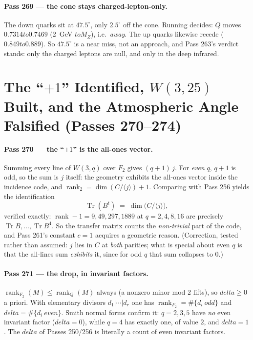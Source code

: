 \documentclass[12pt,a4paper]{article}
\def\mathbf#1{#1}%
\def\text#1{#1}%
\def\delta{delta}%
\def\to{ to }%
\theoremstyle{definition}
\begin{document}
\paragraph{Pass 269 --- the cone stays charged-lepton-only.} The down quarks sit
at $47.5^\circ$, only $2.5^\circ$ off the cone. Running decides: $Q$ moves
$0.7314\to0.7469$ ($2$~GeV $\to M_Z$), i.e.\ \emph{away}. The up quarks likewise
recede ($0.849\to0.889$). So $47.5^\circ$ is a near miss, not an approach, and
Pass 263's verdict stands: only the charged leptons are null, and only in the deep
infrared.


\section{The ``$+1$'' Identified, $W(3,25)$ Built, and the Atmospheric Angle Falsified (Passes 270--274)}

\paragraph{Pass 270 --- the ``$+1$'' is the all-ones vector.} Summing every line
of $W(3,q)$ over $\mathbf F_2$ gives $(q+1)\,j$. For \emph{even} $q$, $q+1$ is odd,
so the sum is $j$ itself: the geometry exhibits the all-ones vector inside the
incidence code, and $\operatorname{rank}_2=\dim(C/\langle j\rangle)+1$. Comparing
with Pass 256 yields the identification
\[
   \operatorname{Tr}(B^t)\;=\;\dim\bigl(C/\langle j\rangle\bigr),
\]
verified exactly: $\operatorname{rank}-1=9,49,297,1889$ at $q=2,4,8,16$ are
precisely $\operatorname{Tr}B,\dots,\operatorname{Tr}B^4$. So the transfer matrix
counts the \emph{non-trivial} part of the code, and Pass 261's constant
$c=1$ acquires a geometric reason. (Correction, tested rather than assumed: $j$
lies in $C$ at \emph{both} parities; what is special about even $q$ is that the
all-lines sum \emph{exhibits} it, since for odd $q$ that sum collapses to $0$.)

\paragraph{Pass 271 --- the drop, in invariant factors.} $\operatorname{rank}_{\mathbf F_2}(M)
\le\operatorname{rank}_{\mathbf Q}(M)$ always (a nonzero minor mod $2$ lifts), so
$\delta\ge0$ a priori. With elementary divisors $d_1|\cdots|d_r$ one has
$\operatorname{rank}_{\mathbf F_2}=\#\{d_i\ \text{odd}\}$ and
$\delta=\#\{d_i\ \text{even}\}$. Smith normal forms confirm it: $q=2,3,5$ have
\emph{no} even invariant factor ($\delta=0$), while $q=4$ has exactly one, of
value $2$, and $\delta=1$. The $\delta$ of Passes 250/256 is literally a count of
even invariant factors.
\end{document}
